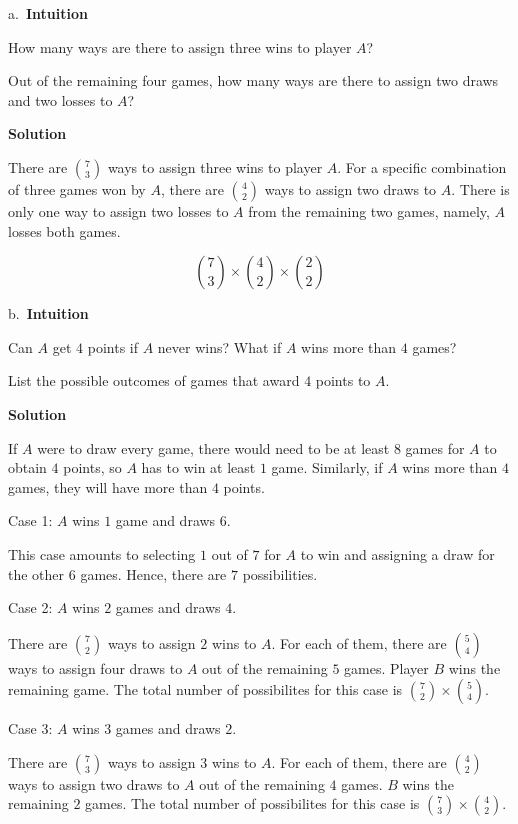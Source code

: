 \documentclass[]{book}
\begin{document}
a.~\textbf{Intuition}

How many ways are there to assign three wins to player \(A\)?

Out of the remaining four games, how many ways are there to assign two
draws and two losses to \(A\)?

 \textbf{Solution}

There are \({7 \choose 3}\) ways to assign three wins to player \(A\).
For a specific combination of three games won by \(A\), there are
\({4 \choose 2}\) ways to assign two draws to \(A\). There is only one
way to assign two losses to \(A\) from the remaining two games, namely,
\(A\) losses both games.

\[ {7 \choose 3} \times {4 \choose 2} \times {2 \choose 2} \]

b.~\textbf{Intuition}

Can \(A\) get \(4\) points if \(A\) never wins? What if \(A\) wins more
than \(4\) games?

List the possible outcomes of games that award \(4\) points to \(A\).

 \textbf{Solution}

If \(A\) were to draw every game, there would need to be at least \(8\)
games for \(A\) to obtain \(4\) points, so \(A\) has to win at least
\(1\) game. Similarly, if \(A\) wins more than \(4\) games, they will
have more than \(4\) points.

Case 1: \(A\) wins \(1\) game and draws \(6\).

This case amounts to selecting \(1\) out of \(7\) for \(A\) to win and
assigning a draw for the other \(6\) games. Hence, there are \(7\)
possibilities.

Case 2: \(A\) wins \(2\) games and draws \(4\).

There are \({7 \choose 2}\) ways to assign \(2\) wins to \(A\). For each
of them, there are \({5 \choose 4}\) ways to assign four draws to \(A\)
out of the remaining \(5\) games. Player \(B\) wins the remaining game.
The total number of possibilites for this case is
\({7 \choose 2} \times {5 \choose 4}\).

Case 3: \(A\) wins \(3\) games and draws \(2\).

There are \({7 \choose 3}\) ways to assign \(3\) wins to \(A\). For each
of them, there are \({4 \choose 2}\) ways to assign two draws to \(A\)
out of the remaining \(4\) games. \(B\) wins the remaining \(2\) games.
The total number of possibilites for this case is
\({7 \choose 3} \times {4 \choose 2}\).
\end{document}
